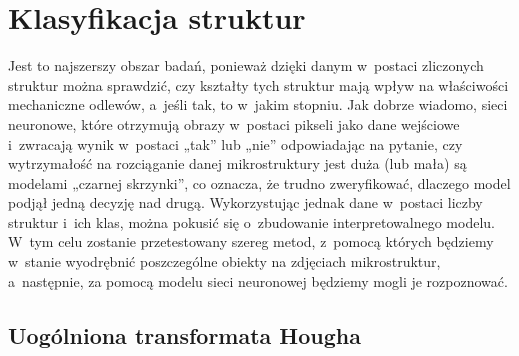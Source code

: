 \section{Klasyfikacja struktur}
\label{sec:klasyfikacja_struktur}

Jest to najszerszy obszar badań, ponieważ dzięki danym w~postaci zliczonych struktur można sprawdzić, czy kształty tych struktur mają wpływ na właściwości mechaniczne odlewów, a~jeśli tak, to w~jakim stopniu. Jak dobrze wiadomo, sieci neuronowe, które otrzymują obrazy w~postaci pikseli jako dane wejściowe i~zwracają wynik w~postaci „tak” lub „nie” odpowiadając na pytanie, czy wytrzymałość na rozciąganie danej mikrostruktury jest duża (lub mała) są modelami „czarnej skrzynki”, co oznacza, że trudno zweryfikować, dlaczego model podjął jedną decyzję nad drugą. Wykorzystując jednak dane w~postaci liczby struktur i~ich klas, można pokusić się o~zbudowanie interpretowalnego modelu. W~tym celu zostanie przetestowany szereg metod, z~pomocą których będziemy w~stanie wyodrębnić poszczególne obiekty na zdjęciach mikrostruktur, a~następnie, za pomocą modelu sieci neuronowej będziemy mogli je rozpoznować. 

\subsection{Uogólniona transformata Hougha}
\label{hough}

